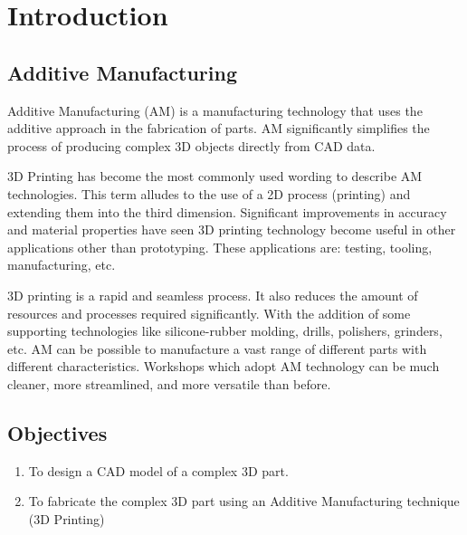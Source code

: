 \section{Introduction}
\lhead{\leftmark}
\label{sec:introduction}
\subsection{Additive Manufacturing}
Additive Manufacturing (AM) is a manufacturing technology that uses the additive approach in the fabrication of parts. AM significantly
simplifies the process of producing complex 3D objects directly from CAD data\cite{edgar2015additive}.

3D Printing has become the most commonly used wording to describe AM technologies. This term alludes to the use of a 2D process (printing) and extending them into the third dimension. Significant improvements in accuracy and material properties have seen 3D printing
technology become useful in other applications other than prototyping. These applications are: testing, tooling, manufacturing, etc. 

3D printing is a rapid and seamless process. It also reduces the amount of resources and processes required significantly. With the addition of some supporting technologies like silicone-rubber
molding, drills, polishers, grinders, etc. AM can be possible to manufacture a vast
range of different parts with different characteristics. Workshops which adopt AM
technology can be much cleaner, more streamlined, and more versatile than before\cite{edgar2015additive}.

\subsection{Objectives}
\begin{enumerate}
\item To design a CAD model of a complex 3D part.
\item To fabricate the complex 3D part using an Additive Manufacturing technique (3D Printing)
\end{enumerate}
